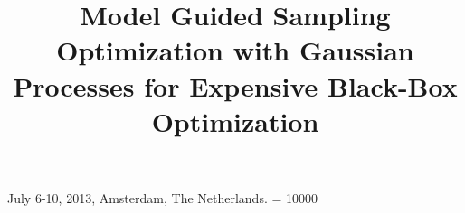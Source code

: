 \documentclass{sig-alternate}
\begin{document}
%
 {July 6-10, 2013, Amsterdam, The Netherlands.}
\widowpenalty = 10000


\title{Model Guided Sampling Optimization with Gaussian Processes for Expensive Black-Box Optimization}
%
%
%
%
%
\end{document}
